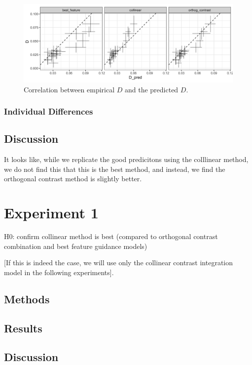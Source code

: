 \documentclass[smallextended]{svjour3}       %
\begin{document}
\begin{figure}
\centering
\includegraphics[width=\textwidth]{../reanalyse_Buetti2019/Bayesian_fig4.png}
\caption{Correlation between empirical $D$ and the predicted $D$.}
\label{fig:buetti2019_D}
\end{figure}

\subsubsection{Individual Differences}


\subsection{Discussion}

It looks like, while we replicate the good predicitons using the colllinear method, we do not find this that this is the best method, and instead, we find the orthogonal contrast method is slightly better. 


\section{Experiment 1}

H0: confirm collinear method is best (compared to orthogonal contrast combination and best feature guidance models)

[If this is indeed the case, we will use only the collinear contrast integration model in the following experiments].

\subsection{Methods}

\subsection{Results}

\subsection{Discussion}
\end{document}
